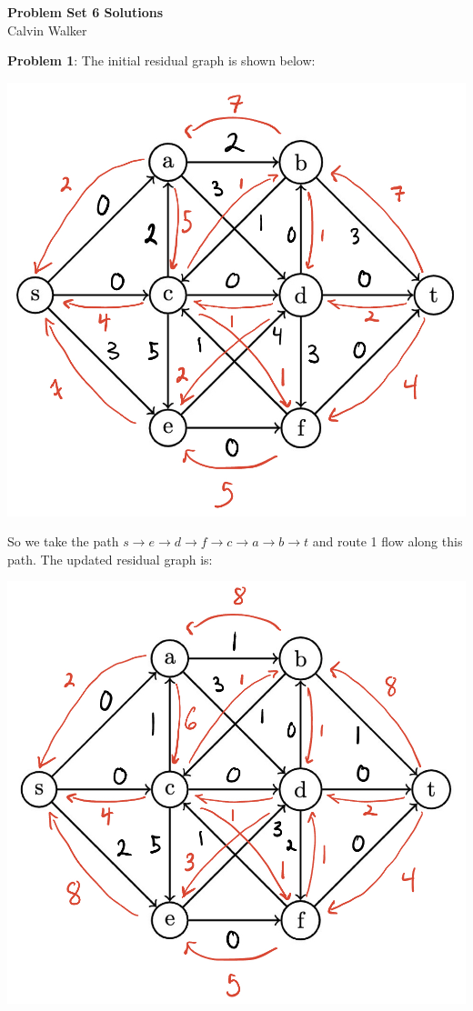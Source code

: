 \documentclass{article}
\begin{document}
\begin{center}
    \Large{\textbf{Problem Set 6 Solutions}} \\[0.25ex]
    Calvin Walker
\end{center}
\textbf{Problem 1}:
The initial residual graph is shown below: 
\begin{center}
    \includegraphics[scale=0.2]{flow1.jpg}
\end{center}
So we take the path $s \rightarrow e \rightarrow d \rightarrow f \rightarrow c \rightarrow a \rightarrow b \rightarrow t$ and route 1 flow along this path. The updated residual graph is: 
\begin{center}
    \includegraphics[scale=0.2]{flow2.jpg}
\end{center}
\end{document}
